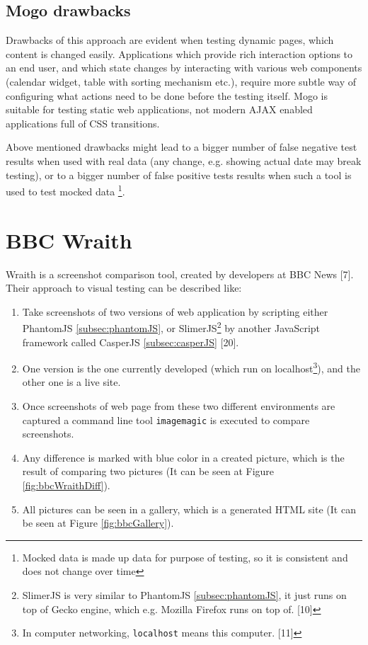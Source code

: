 \documentclass[11pt,oneside,final]{fithesis2}
\begin{document}
  \subsection{Mogo drawbacks}
  
  Drawbacks of this approach are evident when testing dynamic pages, which content is changed easily. Applications which provide rich interaction options to an end user, and which state
  changes by interacting with various web components (calendar widget, table with sorting mechanism etc.), require more subtle way of configuring what actions need to be done before the
  testing itself. Mogo is suitable for testing static web applications, not modern AJAX enabled applications full of CSS transitions.
  
  Above mentioned drawbacks might lead to a bigger number of false negative test results when used with real data (any change, e.g. showing actual date may break testing), or to a bigger 
  number of false positive tests results when such a tool is used to test mocked data \footnote{Mocked data is made up data for purpose of testing, so it is consistent and does not 
  change over time}.
  
  \section{BBC Wraith}
  Wraith is a screenshot comparison tool, created by developers at BBC News [7]. Their approach to visual testing can be described like:
  \begin{enumerate}
   \item Take screenshots of two versions of web application by scripting either PhantomJS \ref{subsec:phantomJS}, or SlimerJS\footnote{SlimerJS is 
   very similar to PhantomJS \ref{subsec:phantomJS}, it just runs on top of Gecko engine, which e.g. Mozilla Firefox runs on top of. [10]} by another JavaScript framework called 
   CasperJS \ref{subsec:casperJS} [20].
   \item One version is the one currently developed (which run on localhost\footnote{In computer networking, \texttt{localhost} means this computer. [11]}), and the other one is a live site.
   \item Once screenshots of web page from these two different environments are captured a command line tool \texttt{imagemagic} is executed to compare screenshots.
   \item Any difference is marked with blue color in a created picture, which is the result of comparing two pictures (It can be seen at Figure \ref{fig:bbcWraithDiff}).
   \item All pictures can be seen in a gallery, which is a generated HTML site (It can be seen at Figure \ref{fig:bbcGallery}).
  \end{enumerate}
  
\end{document}
